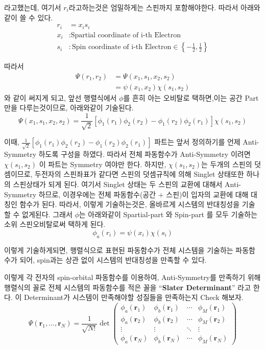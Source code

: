 \documentclass[10pt]{article}
\begin{document}
라고했는데, 
여기서 \(r_i\)라고하는것은 엄밀하게는 스핀까지 포함해야한다. 따라서 아래와같이 쓸 수 있다. 
\begin{align*}
r_i &= x_i s_i\\
x_i &: \text{Spartial coordinate of i-th Electron}\\
s_i &: \text{Spin coordinate of i-th Electron} \in \left\{-\frac{1}{2}, \frac{1}{2}\right\}
\end{align*}

따라서 
\begin{align*}
\Psi(r_1,r_2)&=\Psi(x_1,s_1, x_2,s_2)\\
&=\psi(x_1, x_2)\chi(s_1,s_2)
\end{align*}
와 같이 써지게 되고, 앞선 행렬식에서 \(\phi\)를 흔히 아는 오비탈로 택하면,이는 공간 Part 만을 다루는것이므로, 아래와같이 기술된다. 
\[
\Psi(x_1,s_1, x_2,s_2) = \frac{1}{\sqrt{2}}[\phi_1(r_1)\phi_2(r_2)-\phi_1(r_2)\phi_2(r_1)]\chi(s_1,s_2)
\]

이때, \(\frac{1}{\sqrt{2}}[\phi_1(r_1)\phi_2(r_2)-\phi_1(r_2)\phi_2(r_1)]\) 파트는 앞서 정의하기를 언제 Anti-Symmetry 하도록 구성을 하였다. 
따라서 전체 파동함수가 Anti-Symmetry 이려면 \(\chi(s_1,s_2)\) 이 파트는 Symmetry 여야만 한다. 
하지만, \(\chi(s_1,s_2)\)는 두개의 스핀의 덧셈이므로, 두전자의 스핀좌표가 같다면 스핀의 덧셈규칙에 의해 Singlet 상태또한 하나의 스핀상태가 되게 된다. 
여기서 Singlet 상태는 두 스핀의 교환에 대해서 Anti-Symmetry 하므로, 이경우에는 전체 파동함수(공간 + 스핀)이 입자의 교환에 대해 대칭인 함수가 된다. 
따라서, 이렇게 기술하는것은, 올바르게 시스템의 반대칭성을 기술할 수 없게된다. 
그래서 \(\phi\)는 아래와같이 Spartial-part 와 Spin-part 를 모두 기술하는 소위 스핀오비탈로써 택하게 된다. 
\[
\phi_a(r_i) = \psi(x_i)\chi(s_i)
\]

이렇게 기술하게되면, 
행렬식으로 표현된 파동함수가 전체 시스템을 기술하는 파동함수가 되어, spin과는 상관 없이 시스템의 반대칭성을 만족할 수 있다. 

이렇게 각 전자의 spin-orbital 파동함수를 이용하여, Anti-Symmetry를 만족하기 위해 행렬식의 꼴로 전체 시스템의 파동함수를 적은 꼴을 \enquote{\textbf{Slater Determinant}} 라고 한다. 
이 Determinant가 시스템이 만족해야할 성질들을 만족하는지 Check 해보자. 
\[
\Psi(\mathbf{r}_1, \dots, \mathbf{r}_N) 
= \frac{1}{\sqrt{N!}} \det \begin{pmatrix}
\phi_a(\mathbf{r}_1) & \phi_b(\mathbf{r}_1) & \cdots & \phi_M(\mathbf{r}_1) \\
\phi_a(\mathbf{r}_2) & \phi_b(\mathbf{r}_2) & \cdots & \phi_M(\mathbf{r}_2) \\
\vdots & \vdots & \ddots & \vdots \\
\phi_a(\mathbf{r}_N) & \phi_b(\mathbf{r}_N) & \cdots & \phi_M(\mathbf{r}_N)
\end{pmatrix}
\]
\end{document}
